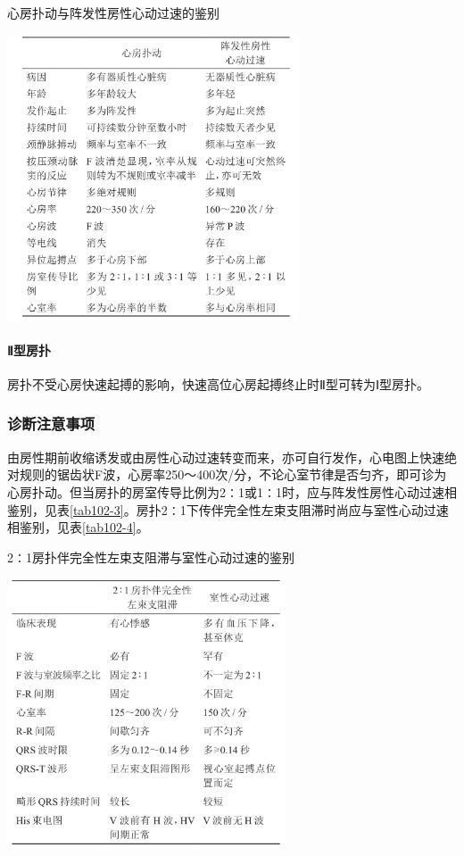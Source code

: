 \begin{table}[htbp]
\centering
\caption{心房扑动与阵发性房性心动过速的鉴别}
\label{tab102-3}
\includegraphics[width=3.39583in,height=3.33333in]{./images/Image00423.jpg}
\end{table}

\paragraph{Ⅱ型房扑}

房扑不受心房快速起搏的影响，快速高位心房起搏终止时Ⅱ型可转为Ⅰ型房扑。

\subsubsection{诊断注意事项}

由房性期前收缩诱发或由房性心动过速转变而来，亦可自行发作，心电图上快速绝对规则的锯齿状F波，心房率250～400次/分，不论心室节律是否匀齐，即可诊为心房扑动。但当房扑的房室传导比例为2∶1或1∶1时，应与阵发性房性心动过速相鉴别，见表\ref{tab102-3}。房扑2∶1下传伴完全性左束支阻滞时尚应与室性心动过速相鉴别，见表\ref{tab102-4}。

\begin{table}[htbp]
\centering
\caption{2∶1房扑伴完全性左束支阻滞与室性心动过速的鉴别}
\label{tab102-4}
\includegraphics[width=3.25in,height=3.15625in]{./images/Image00424.jpg}
\end{table}

